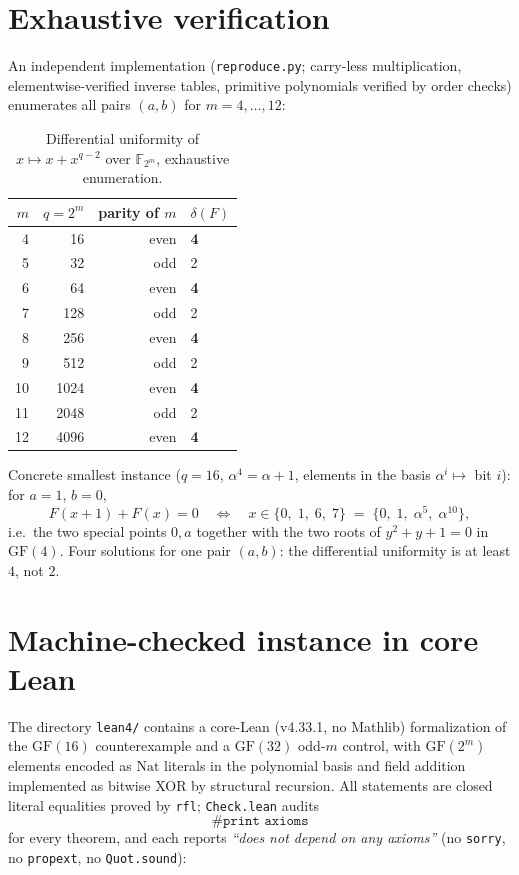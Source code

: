 \documentclass[11pt]{article}
\newcommand{\F}{\mathbb{F}}
\newcommand{\GF}{\mathrm{GF}}
\newcommand{\duni}{\delta}
\begin{document}
\section{Exhaustive verification}

An independent implementation (\texttt{reproduce.py}; carry-less
multiplication, elementwise-verified inverse tables, primitive polynomials
verified by order checks) enumerates all pairs $(a,b)$ for $m = 4, \dots,
12$:

\begin{table}[h]
\centering
\begin{tabular}{rrrl}
\toprule
$m$ & $q = 2^m$ & parity of $m$ & $\duni(F)$ \\
\midrule
4  & 16   & even & \textbf{4} \\
5  & 32   & odd  & 2 \\
6  & 64   & even & \textbf{4} \\
7  & 128  & odd  & 2 \\
8  & 256  & even & \textbf{4} \\
9  & 512  & odd  & 2 \\
10 & 1024 & even & \textbf{4} \\
11 & 2048 & odd  & 2 \\
12 & 4096 & even & \textbf{4} \\
\bottomrule
\end{tabular}
\caption{Differential uniformity of $x \mapsto x + x^{q-2}$ over
$\F_{2^m}$, exhaustive enumeration.}
\end{table}

Concrete smallest instance ($q = 16$, $\alpha^4 = \alpha + 1$, elements in
the basis $\alpha^i \mapsto$ bit $i$): for $a = 1$, $b = 0$,
\[
F(x+1) + F(x) = 0 \quad\Longleftrightarrow\quad x \in \{0,\; 1,\; 6,\; 7\}
\;=\; \{0,\; 1,\; \alpha^5,\; \alpha^{10}\},
\]
i.e.\ the two special points $0, a$ together with the two roots of
$y^2 + y + 1 = 0$ in $\GF(4)$.  Four solutions for one pair $(a,b)$: the
differential uniformity is at least $4$, not $2$.

\section{Machine-checked instance in core Lean}

The directory \texttt{lean4/} contains a core-Lean (v4.33.1, no Mathlib)
formalization of the $\GF(16)$ counterexample and a $\GF(32)$ odd-$m$
control, with $\GF(2^m)$ elements encoded as $\mathrm{Nat}$ literals in the
polynomial basis and field addition implemented as bitwise XOR by structural
recursion.  All statements are closed literal equalities proved by
\texttt{rfl}; \texttt{Check.lean} audits
\[
\texttt{\#print axioms}
\]
for every theorem, and each reports \emph{``does not depend on any
axioms''} (no \texttt{sorry}, no \texttt{propext}, no \texttt{Quot.sound}):
\end{document}
